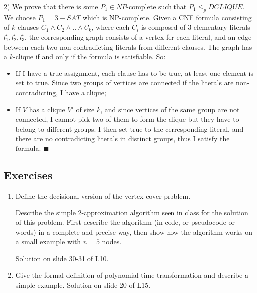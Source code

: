 2) We prove that there is some $P_1 \in NP$-complete such that $P_1 \leq_p DCLIQUE$. We choose $P_1=3-SAT$ which is NP-complete. Given a CNF formula consisting of $k$ clauses $C_1 \land C_2 \land .. \land C_k$, where each $C_i$ is composed of 3 elementary literals $l_1^i, l_2^i, l_3^i$, the corresponding graph consists of a vertex for each literal, and an edge between each two non-contradicting literals from different clauses. The graph has a $k$-clique if and only if the formula is satisfiable. So:
\begin{itemize}
    \item If I have a true assignment, each clause has to be true, at least one element is set to true. Since two groups of vertices are connected if the literals are non-contradicting, I have a clique;
    \item If $V$ has a clique $V'$ of size $k$, and since vertices of the same group are not connected, I cannot pick two of them to form the clique but they have to belong to different groups. I then set true to the corresponding literal, and there are no contradicting literals in distinct groups, thus I satisfy the formula. $\blacksquare$
\end{itemize}


\newpage
\subsection{Exercises}
\begin{enumerate}
    \item Define the decisional version of the vertex cover problem.
    
    Describe the simple 2-approximation algorithm seen in class for the solution of this problem. First describe the algorithm (in code, or pseudocode or words) in a complete and precise way, then show how the algorithm works on a small example with $n=5$ nodes.

    Solution on slide 30-31 of L10.

    \item Give the formal definition of polynomial time transformation and describe a simple example. Solution on slide 20 of L15.
\end{enumerate}
